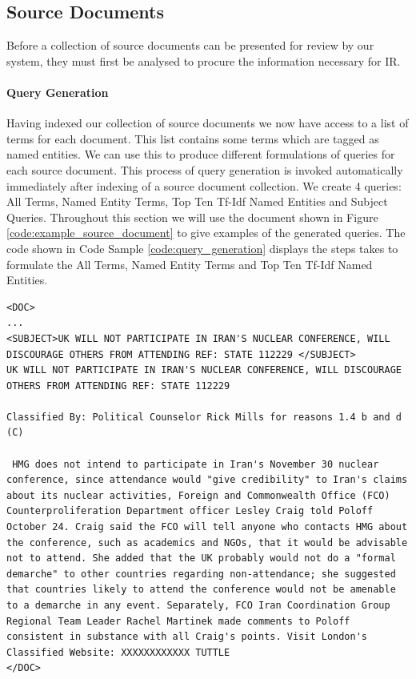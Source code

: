 \documentclass{l4proj}
\newenvironment{codelisting}{\captionsetup{type=listing}}{}
\begin{document}
\subsection{Source Documents}
Before a collection of source documents can be presented for review by our system, they must first be analysed to procure the information necessary for IR.
\paragraph{Query Generation} \label{querygen}
Having indexed our collection of source documents we now have access to a list of terms for each document. This list contains some terms which are tagged as named entities. We can use this to produce different formulations of queries for each source document. This process of query generation is invoked automatically immediately after indexing of a source document collection.
We create 4 queries: All Terms, Named Entity Terms, Top Ten Tf-Idf Named Entities and Subject Queries.
Throughout this section we will use the document shown in Figure \ref{code:example_source_document} to give examples of the generated queries.
The code shown in Code Sample \ref{code:query_generation} displays the steps takes to formulate the All Terms, Named Entity Terms and Top Ten Tf-Idf Named Entities.
\begin{codelisting}
\begin{verbatim}
<DOC>
...
<SUBJECT>UK WILL NOT PARTICIPATE IN IRAN'S NUCLEAR CONFERENCE, WILL DISCOURAGE OTHERS FROM ATTENDING REF: STATE 112229 </SUBJECT>
UK WILL NOT PARTICIPATE IN IRAN'S NUCLEAR CONFERENCE, WILL DISCOURAGE OTHERS FROM ATTENDING REF: STATE 112229

Classified By: Political Counselor Rick Mills for reasons 1.4 b and d (C)

 HMG does not intend to participate in Iran's November 30 nuclear conference, since attendance would "give credibility" to Iran's claims about its nuclear activities, Foreign and Commonwealth Office (FCO) Counterproliferation Department officer Lesley Craig told Poloff October 24. Craig said the FCO will tell anyone who contacts HMG about the conference, such as academics and NGOs, that it would be advisable not to attend. She added that the UK probably would not do a "formal demarche" to other countries regarding non-attendance; she suggested that countries likely to attend the conference would not be amenable to a demarche in any event. Separately, FCO Iran Coordination Group Regional Team Leader Rachel Martinek made comments to Poloff consistent in substance with all Craig's points. Visit London's Classified Website: XXXXXXXXXXXX TUTTLE
</DOC>
\end{verbatim}
\label{code:example_source_document}
\end{codelisting}
\end{document}
